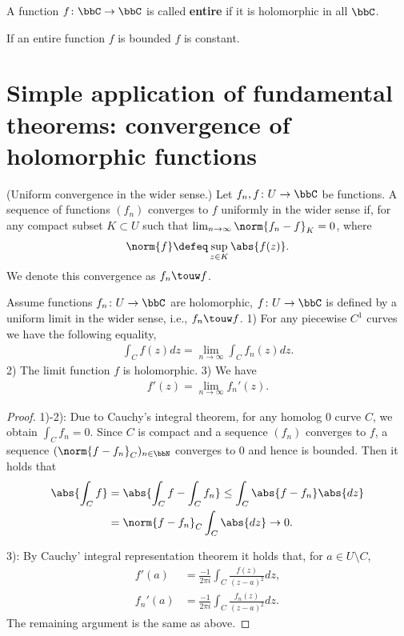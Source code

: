 \documentclass[openany, a4paper, oneside]{jsbook}
\begin{document}
A function $f \colon \bbC \to \bbC$ is called \textbf{entire} if it is holomorphic in all $\bbC$.
\begin{thm}
 If an entire function $f$ is bounded $f$ is constant.
\end{thm}
\section{Simple application of fundamental theorems: convergence of holomorphic functions}

\begin{defn}\textup{(Uniform convergence in the wider sense.)}
 Let $f_n, f \colon U \to \bbC$ be functions.
 A sequence of functions $(f_n)$ converges to $f$ uniformly in the wider sense if,
 for any compact subset $K \subset U$ such that $\lim_{n \to \infty} \norm{f_n - f}_K = 0$, where
\begin{align}
 \norm{f}
 \defeq
 \sup_{z \in K} \abs{f (z)}.
\end{align}
We denote this convergence as $f_n \touw f$.
\end{defn}
\begin{thm}
 Assume functions $f_n \colon U \to \bbC$ are holomorphic, $f \colon U \to \bbC$ is defined by
 a uniform limit in the wider sense, i.e., $f_n \touw f$.
 1) For any piecewise $C^1$ curves we have the following equality,
    \begin{align}
     \int_C f (z) dz = \lim_{n \to \infty} \int_C f_n (z) dz.
    \end{align}
 2) The limit function $f$ is holomorphic.
 3) We have
    \begin{align}
     f'(z) = \lim_{n \to \infty} f_n' (z).
    \end{align}
\end{thm}
\begin{proof}
1)-2): Due to Cauchy's integral theorem, for any homolog 0 curve $C$, we obtain $\int_C f_n = 0$.
Since $C$ is compact and a sequence $(f_n)$ converges to $f$,
a sequence $(\norm{f - f_n}_C)_{n \in \bbN}$ converges to 0 and hence is bounded.
Then it holds that
\begin{align}
 \abs{\int_C f}
 &=
 \abs{\int_C f - \int_C f_n}
 \leq
 \int_C \abs{f - f_n} \abs{dz} \\
 &=
 \norm{f - f_n}_C \int_C \abs{dz} \to 0.
\end{align}

3): By Cauchy' integral representation theorem it holds that, for $a \in U \setminus C$,
\begin{align}
 f'(a)
 &=
 \frac{-1}{2 \pi i} \int_C \frac{f (z)}{(z-a)^2} dz, \\
 f_n'(a)
 &=
 \frac{-1}{2 \pi i} \int_C \frac{f_n (z)}{(z-a)^2} dz.
\end{align}
The remaining argument is the same as above.
\end{proof}
\end{document}
